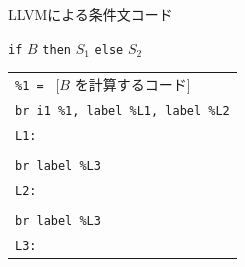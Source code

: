 \documentclass[dvipdfmx]{beamer}
\begin{document}






\begin{frame}{LLVMによる条件文コード}

  \texttt{if} {$B$} \texttt{then} {$S_1$} \texttt{else} {$S_2$}

  \vspace*{5mm}

  \begin{tabular}{l}
    \texttt{\%1 = } [$B$ を計算するコード]             \\
    \texttt{br i1 \%1, label \%L1, label \%L2} \\
    \texttt{L1:}                               \\
    \quad [$S_1$のコード]                          \\
    \texttt{br label \%L3}                     \\
    \texttt{L2:}                               \\
    \quad [$S_2$のコード]                          \\
    \texttt{br label \%L3}                     \\
    \texttt{L3:}
  \end{tabular}



\end{frame}
\end{document}
